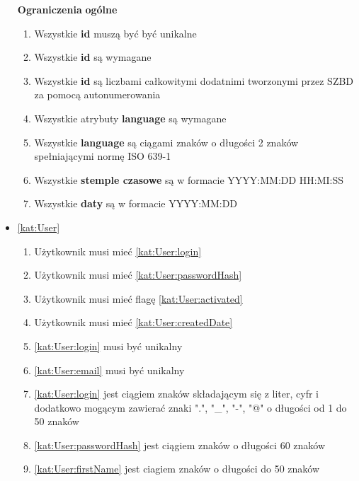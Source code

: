 \begin{itemize}[label={\textbf{Ograniczenia dla}}, wide, labelwidth=!, labelindent=0pt]
    \setlength\itemsep{1em}
    \item[\textbf{Ograniczenia}] \textbf{ogólne}
    \begin{enumerate}[label={\textbf{OGR/\protect\threedigits{\arabic{enumi}}}}, wide, labelwidth=!, align=left, leftmargin=3cm]
        \item Wszystkie \textbf{id} muszą być być unikalne
        \item Wszystkie \textbf{id} są wymagane
        \item Wszystkie \textbf{id} są liczbami całkowitymi dodatnimi tworzonymi przez SZBD za pomocą autonumerowania
        \item Wszystkie atrybuty \textbf{language} są wymagane
        \item Wszystkie \textbf{language} są ciągami znaków o długości 2 znaków spełniającymi normę ISO 639-1
        \item Wszystkie \textbf{stemple czasowe} są w formacie YYYY:MM:DD HH:MI:SS
        \item Wszystkie \textbf{daty} są w formacie YYYY:MM:DD
    \end{enumerate}
    \item\ref{kat:User}
    \begin{enumerate}[label={\textbf{OGR/\protect\threedigits{\arabic{enumi}}}}, wide, labelwidth=!, align=left, leftmargin=3cm, resume]
        \item Użytkownik musi mieć \ref{kat:User:login}
        \item Użytkownik musi mieć \ref{kat:User:passwordHash}
        \item Użytkownik musi mieć flagę \ref{kat:User:activated}
        \item Użytkownik musi mieć \ref{kat:User:createdDate}
        \item \ref{kat:User:login} musi być unikalny
        \item \ref{kat:User:email} musi być unikalny
        \item \ref{kat:User:login} jest ciągiem znaków składającym się z liter, cyfr i dodatkowo mogącym zawierać znaki ".", "\_", "-", "@" o długości od 1 do 50 znaków
        \item \ref{kat:User:passwordHash} jest ciągiem znaków o długości 60 znaków
        \item \ref{kat:User:firstName} jest ciagiem znaków o długości do 50 znaków

\end{enumerate}
\end{itemize}
